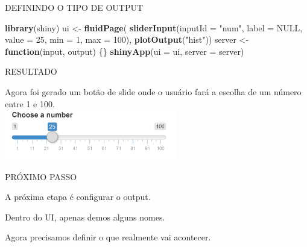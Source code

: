 \documentclass[
  ignorenonframetext,
]{beamer}
\newenvironment{Shaded}{\begin{snugshade}}{\end{snugshade}}
\newcommand{\ControlFlowTok}[1]{\textcolor[rgb]{0.13,0.29,0.53}{\textbf{#1}}}
\newcommand{\DataTypeTok}[1]{\textcolor[rgb]{0.13,0.29,0.53}{#1}}
\newcommand{\DecValTok}[1]{\textcolor[rgb]{0.00,0.00,0.81}{#1}}
\newcommand{\KeywordTok}[1]{\textcolor[rgb]{0.13,0.29,0.53}{\textbf{#1}}}
\newcommand{\NormalTok}[1]{#1}
\newcommand{\OtherTok}[1]{\textcolor[rgb]{0.56,0.35,0.01}{#1}}
\newcommand{\StringTok}[1]{\textcolor[rgb]{0.31,0.60,0.02}{#1}}
\begin{document}
\begin{frame}[fragile]{DEFININDO O TIPO DE OUTPUT}
\protect\hypertarget{definindo-o-tipo-de-output}{}


\begin{Shaded}
\begin{Highlighting}[]
\KeywordTok{library}\NormalTok{(shiny)}
\NormalTok{ui <-}\StringTok{ }\KeywordTok{fluidPage}\NormalTok{(}
  \KeywordTok{sliderInput}\NormalTok{(}\DataTypeTok{inputId =} \StringTok{"num"}\NormalTok{,}
              \DataTypeTok{label =} \OtherTok{NULL}\NormalTok{,}
              \DataTypeTok{value =} \DecValTok{25}\NormalTok{, }\DataTypeTok{min =} \DecValTok{1}\NormalTok{, }\DataTypeTok{max =} \DecValTok{100}\NormalTok{), }
  \KeywordTok{plotOutput}\NormalTok{(}\StringTok{"hist"}\NormalTok{))}
\NormalTok{server <-}\StringTok{ }\ControlFlowTok{function}\NormalTok{(input, output) \{\}}
\KeywordTok{shinyApp}\NormalTok{(}\DataTypeTok{ui =}\NormalTok{ ui, }\DataTypeTok{server =}\NormalTok{ server)}
\end{Highlighting}
\end{Shaded}

\end{frame}

\begin{frame}{RESULTADO}
\protect\hypertarget{resultado}{}

\begin{center}
      Agora foi gerado um \alert{botão de slide} onde o usuário fará a escolha de um número entre 1 e 100.\\\bigskip
    \includegraphics[width=75mm]{imagens/p1}
\end{center}

\end{frame}

\begin{frame}{PRÓXIMO PASSO}
\protect\hypertarget{proximo-passo-1}{}

\begin{center}
A próxima etapa é \alert{configurar} o output.
\end{center}
\begin{center} 
Dentro do UI, apenas demos alguns nomes.
\end{center}
\begin{center}
Agora precisamos definir o que realmente vai acontecer.
\end{center}

\end{frame}
\end{document}
